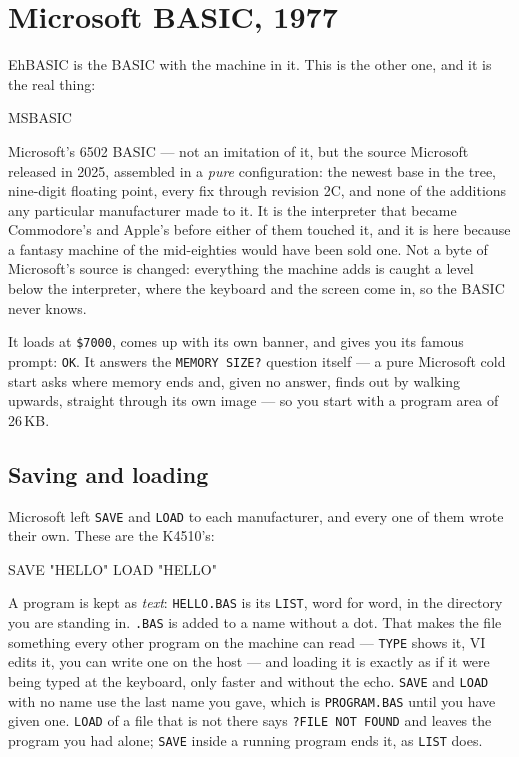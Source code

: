 \chapter{Microsoft BASIC, 1977}\label{cha:msbasic}

EhBASIC is the BASIC with the machine in it. This is the other one, and
it is the real thing:

\begin{type}
MSBASIC
\end{type}

\noindent Microsoft's 6502 BASIC --- not an imitation of it, but the
source Microsoft released in 2025, assembled in a \emph{pure}
configuration: the newest base in the tree, nine-digit floating point,
every fix through revision 2C, and none of the additions any particular
manufacturer made to it. It is the interpreter that became Commodore's
and Apple's before either of them touched it, and it is here because a
fantasy machine of the mid-eighties would have been sold one. Not a byte
of Microsoft's source is changed: everything the machine adds is caught
a level below the interpreter, where the keyboard and the screen come
in, so the BASIC never knows.


It loads at \texttt{\$7000}, comes up with its own banner, and gives you
its famous prompt: \verb|OK|. It answers the \texttt{MEMORY SIZE?}
question itself --- a pure Microsoft cold start asks where memory ends
and, given no answer, finds out by walking upwards, straight through its
own image --- so you start with a program area of 26\,KB.

\section{Saving and loading}
Microsoft left \verb|SAVE| and \verb|LOAD| to each manufacturer, and
every one of them wrote their own. These are the K4510's:

\begin{type}
SAVE "HELLO"
LOAD "HELLO"
\end{type}

\noindent A program is kept as \emph{text}: \texttt{HELLO.BAS} is its
\verb|LIST|, word for word, in the directory you are standing in.
\texttt{.BAS} is added to a name without a dot. That makes the file
something every other program on the machine can read --- \verb|TYPE|
shows it, VI edits it, you can write one on the host --- and loading it
is exactly as if it were being typed at the keyboard, only faster and
without the echo. \verb|SAVE| and \verb|LOAD| with no name use the last
name you gave, which is \texttt{PROGRAM.BAS} until you have given one.
\verb|LOAD| of a file that is not there says \verb|?FILE NOT FOUND| and
leaves the program you had alone; \verb|SAVE| inside a running program
ends it, as \verb|LIST| does.

